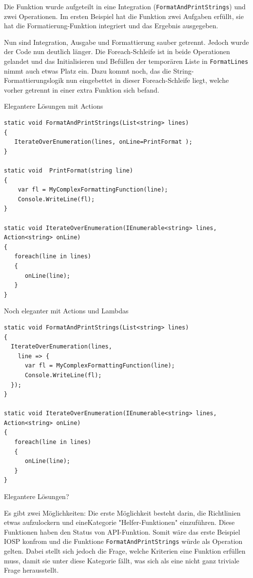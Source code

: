 \documentclass[11pt]{article}
\begin{document}
Die Funktion wurde aufgeteilt in eine Integration (\texttt{FormatAndPrintStrings}) und zwei Operationen.
Im ersten Beispiel hat die Funktion zwei Aufgaben erfüllt, sie hat die Formatierung-Funktion integriert und 
das Ergebnis ausgegeben.

Nun sind Integration, Ausgabe und Formattierung sauber getrennt.
Jedoch wurde der Code nun deutlich länger. Die Foreach-Schleife ist in beide Operationen gelandet und das Initialisieren und
Befüllen der temporären Liste in \texttt{FormatLines} nimmt auch etwas Platz ein.
Dazu kommt noch, das die String-Formattierungslogik nun eingebettet in dieser Foreach-Schleife liegt, welche vorher getrennt in
einer extra Funktion sich befand. 

Elegantere Lösungen mit Actions

\begin{verbatim}
static void FormatAndPrintStrings(List<string> lines)
{
   IterateOverEnumeration(lines, onLine=PrintFormat );
}

static void  PrintFormat(string line)
{
    var fl = MyComplexFormattingFunction(line);
    Console.WriteLine(fl);
}

static void IterateOverEnumeration(IEnumerable<string> lines, Action<string> onLine)
{
   foreach(line in lines)
   {
      onLine(line);
   }
}
\end{verbatim}

Noch eleganter mit Actions und Lambdas

\begin{verbatim}
static void FormatAndPrintStrings(List<string> lines)
{
  IterateOverEnumeration(lines,
    line => {
      var fl = MyComplexFormattingFunction(line);
      Console.WriteLine(fl);
  });
}

static void IterateOverEnumeration(IEnumerable<string> lines, Action<string> onLine)
{
   foreach(line in lines)
   {
      onLine(line);
   }
}
\end{verbatim}


Elegantere Lösungen?

Es gibt zwei Möglichkeiten: Die erste Möglichkeit besteht darin, die Richtlinien etwas aufzulockern und eineKategorie "Helfer-Funktionen" einzuführen.
Diese Funktionen haben den Status von API-Funktion. Somit wäre das erste Beispiel IOSP konfrom und die Funktione \texttt{FormatAndPrintStrings}
würde als Operation gelten.
Dabei stellt sich jedoch die Frage, welche Kriterien eine Funktion erfüllen muss, damit sie unter diese Kategorie 
fällt, was sich als eine nicht ganz triviale Frage herausstellt.
\end{document}
